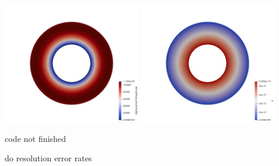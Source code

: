 \begin{center}
\includegraphics[width=6cm]{python_codes/fieldstone_36/disp}
\includegraphics[width=6cm]{python_codes/fieldstone_36/p}
\end{center}

code not finished

do resolution error rates


